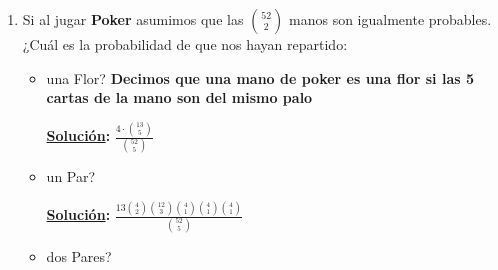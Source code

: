 \documentclass[11pt,letterpaper]{report}
\newcommand{\N}{\mathbb{N}}
\newcommand{\sol}{\textbf{\underline{Solución}: }} %
\begin{document}
\begin{enumerate}
\begin{itemize}
    \item Define los siguientes eventos en terminos de $S$.
    
    Asume que $A$ lanza primero la moneda, denoganar lanza $B$, de no ganarlanza $C$ y en
    caso de no ganar nadie se repite el proceso.    

    \sol (Asumiendo que $A$ tiró, luego $B$ y al final $C$ y así consecutivamente.)

    \begin{enumerate}[label=\alph*)]
        \item $A$ gana = $A$
        
        $A$ gana si y solo si hay $3n$ 0's precedidos de él (un \texttt{1}),
        ósea $\underbrace{0 \cdots 0}_{3n} 1$ con $n \in \N$.

        \item $B$ gana = $B$
        
        $B$ gana si y solo si hay $3n+1$ 0's precedidos de él (un \texttt{1}),
        ósea $\underbrace{0 \cdots 0}_{3n+1} 1$ con $n \in \N$.

        \item $(A \cup B)^c$
        
        Este evento significa que $C$ ganó o nadie ganó. Para definir el evento en el que $C$ ganó
        sería análogo a los incisos anteriores, ósea $\underbrace{0 \cdots 0}_{3n+2} 1$, y para
        definir que nadie ganó sería $000\cdots$.
        
    \end{enumerate}

\end{itemize}

\item Si al jugar \textbf{Poker} asumimos que las $\binom{52}{2}$ manos son igualmente probables.
¿Cuál es la probabilidad de que nos hayan repartido:

\begin{itemize}
    \item una Flor? \textbf{Decimos que una mano de poker es una flor si las 5 cartas de la mano son
    del mismo palo}

    \sol $\frac{{4} \cdot \binom{13}{5}}{\binom{52}{5}}$
    

    \item un Par?
    
    \sol $\frac{{13} \binom{4}{2} \binom{12}{3} \binom{4}{1} \binom{4}{1} \binom {4}{1}}{\binom{52}{5}}$


    \item dos Pares?
    

\end{itemize}
\end{enumerate}
\end{document}
